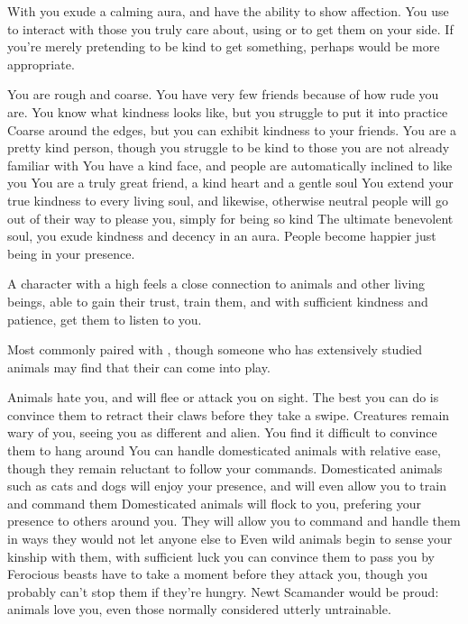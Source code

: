 
With  you exude a calming aura, and have the ability to show affection. You use  to interact with those you truly care about, using  or  to get them on your side. If you're merely pretending to be kind to get something, perhaps  would be more appropriate. 

\ratingTable
{You are rough and coarse. You have very few friends because of how rude you are.}
{You know what kindness looks like, but you struggle to put it into practice}
{Coarse around the edges, but you can exhibit kindness to your friends.}
{You are a pretty kind person, though you struggle to be kind to those you are not already familiar with}
{You have a kind face, and people are automatically inclined to like you}
{You are a truly great friend, a kind heart and a gentle soul}
{You extend your true kindness to every living soul, and likewise, otherwise neutral people will go out of their way to please you, simply for being so kind}
{The ultimate benevolent soul, you exude kindness and decency in an aura. People become happier just being in your presence.}



A character with a high  feels a close connection to animals and other living beings, able to gain their trust, train them, and with sufficient kindness and patience, get them to listen to you. 

Most commonly paired with , though someone who has extensively studied animals may find that their  can come into play. 

\ratingTable
{Animals hate you, and will flee or attack you on sight. The best you can do is convince them to retract their claws before they take a swipe.}
{Creatures remain wary of you, seeing you as different and alien. You find it difficult to convince them to hang around}
{You can handle domesticated animals with relative ease, though they remain reluctant to follow your commands.}
{Domesticated animals such as cats and dogs will enjoy your presence, and will even allow you to train and command them}
{Domesticated animals will flock to you, prefering your presence to others around you. They will allow you to command and handle them in ways they would not let anyone else to}
{Even wild animals begin to sense your kinship with them, with sufficient luck you can convince them to pass you by}
{Ferocious beasts have to take a moment before they attack you, though you probably can't stop them if they're hungry.}
{Newt Scamander would be proud: animals love you, even those normally considered utterly untrainable.}

